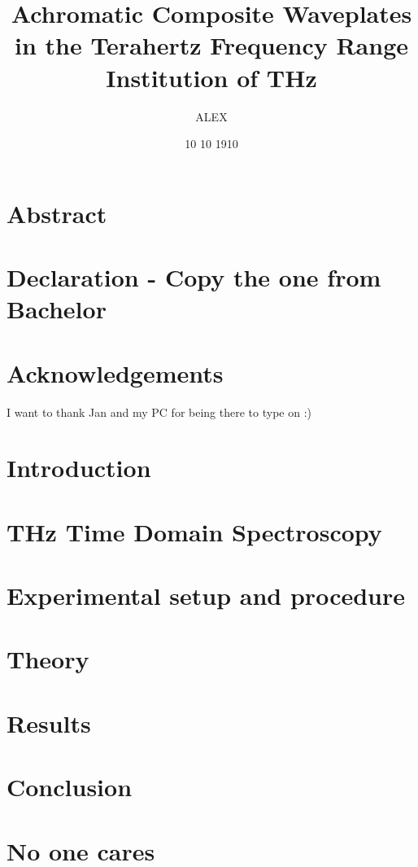 \documentclass[12pt, a4paper]{report}
\title{
{Achromatic Composite Waveplates in the Terahertz Frequency Range}\\
{\large Institution of THz}\\
}
\author{ALEX}
\date{10 10 1910}
\begin{document}
\maketitle

\chapter*{Abstract}


\chapter*{Declaration - Copy the one from Bachelor}

\chapter*{Acknowledgements}
I want to thank Jan and my PC for being there to type on :)

\tableofcontents



\chapter{Introduction}


\chapter{THz Time Domain Spectroscopy}


\chapter{Experimental setup and procedure}


\chapter{Theory}


\chapter{Results}


\chapter{Conclusion}


\appendix
\chapter{No one cares}


\sloppy
\printbibliography

\end{document}
